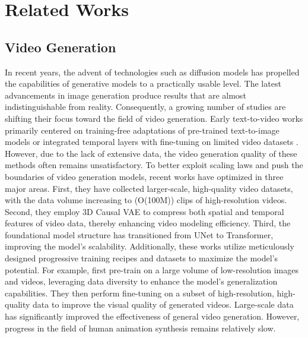 \section{Related Works}
\subsection{Video Generation}
  In recent years, the advent of technologies such as diffusion models \cite{jonathan2020ddpm, song2021ddim, karras2022edm, song2020score, liu2022reflow} has propelled the capabilities of generative models to a practically usable level. The latest advancements in image generation \cite{sd3, chen2024pixartdelta} produce results that are almost indistinguishable from reality. Consequently, a growing number of studies \cite{zhou2022magicvideo, zeng2024pxldance, hong2022cogvideo, yang2024cogvideox, openai2024sora, kong2024hunyuanvideo, polyak2024moviegen} are shifting their focus toward the field of video generation.
  Early text-to-video works primarily centered on training-free adaptations of pre-trained text-to-image models \cite{singer2022make, wu2023tune, qi2023fatezero} or integrated temporal layers with fine-tuning on limited video datasets \cite{guo2023animatediff, zhou2022magicvideo, wang2023modelscope}. However, due to the lack of extensive data, the video generation quality of these methods often remains unsatisfactory. To better exploit scaling laws and push the boundaries of video generation models, recent works \cite{openai2024sora, yang2024cogvideox, kong2024hunyuanvideo, polyak2024moviegen} have optimized in three major areas. First, they have collected larger-scale, high-quality video datasets, with the data volume increasing to (O(100M)) clips of high-resolution videos. Second, they employ 3D Causal VAE \cite{yu20233DVAE} to compress both spatial and temporal features of video data, thereby enhancing video modeling efficiency. Third, the foundational model structure has transitioned from UNet to Transformer, improving the model’s scalability. Additionally, these works utilize meticulously designed progressive training recipes and datasets to maximize the model's potential. For example, \cite{polyak2024moviegen, kong2024hunyuanvideo} first pre-train on a large volume of low-resolution images and videos, leveraging data diversity to enhance the model's generalization capabilities. They then perform fine-tuning on a subset of high-resolution, high-quality data to improve the visual quality of generated videos. Large-scale data has significantly improved the effectiveness of general video generation. However, progress in the field of human animation synthesis remains relatively slow.
  
